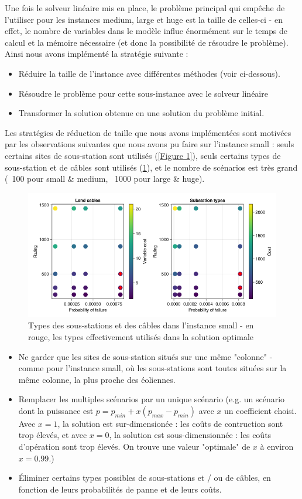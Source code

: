 \documentclass[a4paper,12pt]{article}
\begin{document}
Une fois le solveur linéaire mis en place, le problème principal qui empêche de l'utiliser pour les instances medium, large et huge est la taille de celles-ci - en effet, le nombre de variables dans le modèle influe énormément sur le temps de calcul et la mémoire nécessaire (et donc la possibilité de résoudre le problème). 
Ainsi nous avons implémenté la stratégie suivante : \\
\begin{itemize}
    \item Réduire la taille de l'instance avec différentes méthodes (voir ci-dessous).
    \item Résoudre le problème pour cette sous-instance avec le solveur linéaire
    \item Transformer la solution obtenue en une solution du problème initial. \\
\end{itemize}
Les stratégies de réduction de taille que nous avons implémentées sont motivées par les observations suivantes que nous avons pu faire sur l'instance small :
seuls certains sites de sous-station sont utilisés (\ref{Figure 1}), seuls certains types de sous-station et de câbles sont utilisés (\ref{Figure 2}), et le nombre de scénarios est très grand (~100 pour small \& medium, ~1000 pour large \& huge).
\begin{figure}[h]
    \centering
    \includegraphics[scale=0.3]{small-types.png}
    \caption{Types des sous-stations et des câbles dans l'instance small - en rouge, les types effectivement utilisés dans la solution optimale}
    \label{Figure 2}
\end{figure}
\begin{itemize}
    \item Ne garder que les sites de sous-station situés sur une même "colonne" - comme pour l'instance small, où les sous-stations sont toutes situées sur la même colonne, la plus proche des éoliennes.
    \item Remplacer les multiples scénarios par un unique scénario (e.g. un scénario dont la puissance est $p = p_{min} + x(p_{max} - p_{min})$ avec $x$ un coefficient choisi. Avec $x = 1$, la solution est sur-dimensionée : les coûts de contruction sont trop élevés, et avec $x = 0$, la solution est sous-dimensionnée : les coûts d'opération sont trop élevés. On trouve une valeur "optimale" de $x$ à environ $ x = 0.99$.)
    \item Éliminer certains types possibles de sous-stations et / ou de câbles, en fonction de leurs probabilités de panne et de leurs coûts.
\end{itemize}
\end{document}
